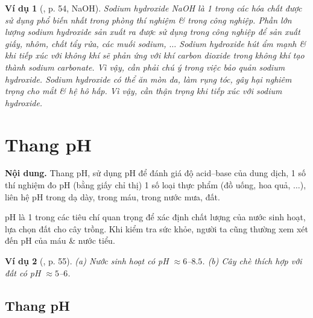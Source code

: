 \documentclass{article}
\newtheorem{vidu}{Ví dụ}
\begin{document}
\begin{vidu}[\cite{SGK_KHTN_8_Canh_Dieu}, p. 54, NaOH]
	Sodium hydroxide \emph{NaOH} là 1 trong các hóa chất được sử dụng phổ biến nhất trong phòng thí nghiệm \& trong công nghiệp. Phần lớn lượng sodium hydroxide sản xuất ra được sử dụng trong công nghiệp để sản xuất giấy, nhôm, chất tẩy rửa, các muối sodium, $\ldots$ Sodium hydroxide hút ẩm mạnh \& khi tiếp xúc với không khí sẽ phản ứng với khí carbon dioxide trong không khí tạo thành sodium carbonate. Vì vậy, cần phải chú ý trong việc bảo quản sodium hydroxide. Sodium hydroxide có thể ăn mòn da, làm rụng tóc, gây hại nghiêm trọng cho mắt \& hệ hô hấp. Vì vậy, cần thận trọng khi tiếp xúc với sodium hydroxide.
\end{vidu}
\noindent{}


\section{Thang pH}
\textsf{\textbf{Nội dung.} Thang pH, sử dụng pH để đánh giá độ acid--base của dung dịch, 1 số thí nghiệm đo pH (bằng giấy chỉ thị) 1 số loại thực phẩm (đồ uống, hoa quả, $\ldots$), liên hệ pH trong dạ dày, trong máu, trong nước mưa, đất.}

pH là 1 trong các tiêu chí quan trọng để xác định chất lượng của nước sinh hoạt, lựa chọn đất cho cây trồng. Khi kiểm tra sức khỏe, người ta cũng thường xem xét đến pH của máu \& nước tiểu.

\begin{vidu}[\cite{SGK_KHTN_8_Canh_Dieu}, p. 55]
	(a) Nước sinh hoạt có pH $\approx6$--$8.5$. (b) Cây chè thích hợp với đất có pH $\approx5$--$6$.
\end{vidu}

\subsection{Thang pH}
\end{document}
